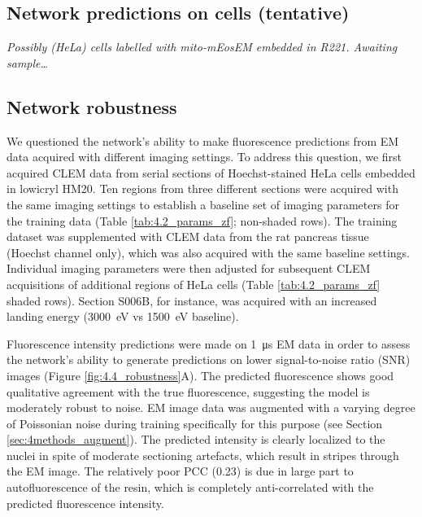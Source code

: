 \subsection{Network predictions on cells (tentative)}
\label{sec:4results_cells}

\textit{
Possibly (HeLa) cells labelled with mito-mEosEM embedded in R221. Awaiting sample\ldots
}




\subsection{Network robustness}
\label{sec:4results_robustness}

We questioned the network's ability to make fluorescence predictions from EM data acquired with different imaging settings. To address this question, we first acquired CLEM data from serial sections of Hoechst-stained HeLa cells embedded in lowicryl HM20. Ten regions from three different sections were acquired with the same imaging settings to establish a baseline set of imaging parameters for the training data (Table \ref{tab:4.2_params_zf}; non-shaded rows). The training dataset was supplemented with CLEM data from the rat pancreas tissue (Hoechst channel only), which was also acquired with the same baseline settings. Individual imaging parameters were then adjusted for subsequent CLEM acquisitions of additional regions of HeLa cells (Table \ref{tab:4.2_params_zf} shaded rows). Section S006B, for instance, was acquired with an increased landing energy (\SI{3000}{\electronvolt} vs \SI{1500}{\electronvolt} baseline).

Fluorescence intensity predictions were made on \SI{1}{\micro\second} EM data in order to assess the network's ability to generate predictions on lower signal-to-noise ratio (SNR) images (Figure \ref{fig:4.4_robustness}A). The predicted fluorescence shows good qualitative agreement with the true fluorescence, suggesting the model is moderately robust to noise. EM image data was augmented with a varying degree of Poissonian noise during training specifically for this purpose (see Section \ref{sec:4methods_augment}). The predicted intensity is clearly localized to the nuclei in spite of moderate sectioning artefacts, which result in stripes through the EM image. The relatively poor PCC (0.23) is due in large part to autofluorescence of the resin, which is completely anti-correlated with the predicted fluorescence intensity.

